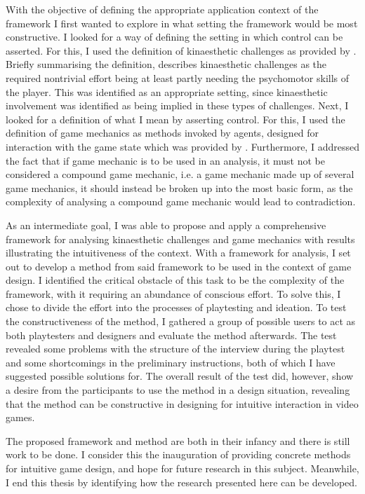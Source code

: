 With the objective of defining the appropriate application context of the framework I first wanted to explore in what setting the framework would be most constructive. I looked for a way of defining the setting in which control can be asserted. For this, I used the definition of kinaesthetic challenges as provided by . Briefly summarising the definition,  describes kinaesthetic challenges as the required nontrivial effort being at least partly needing the psychomotor skills of the player. This was identified as an appropriate setting, since kinaesthetic involvement was identified as being implied in these types of challenges. Next, I looked for a definition of what I mean by asserting control. For this, I used the definition of game mechanics as methods invoked by agents, designed for interaction with the game state which was provided by . Furthermore, I addressed the fact that if game mechanic is to be used in an analysis, it must not be considered a compound game mechanic, i.e. a game mechanic made up of several game mechanics, it should instead be broken up into the most basic form, as the complexity of analysing a compound game mechanic would lead to contradiction.

As an intermediate goal, I was able to propose and apply a comprehensive framework for analysing kinaesthetic challenges and game mechanics with results illustrating the intuitiveness of the context. With a framework for analysis, I set out to develop a method from said framework to be used in the context of game design. I identified the critical obstacle of this task to be the complexity of the framework, with it requiring an abundance of conscious effort. To solve this, I chose to divide the effort into the processes of playtesting and ideation. To test the constructiveness of the method, I gathered a group of possible users to act as both playtesters and designers and evaluate the method afterwards. The test revealed some problems with the structure of the interview during the playtest and some shortcomings in the preliminary instructions, both of which I have suggested possible solutions for. The overall result of the test did, however, show a desire from the participants to use the method in a design situation, revealing that the method can be constructive in designing for intuitive interaction in video games.

The proposed framework and method are both in their infancy and there is still work to be done. I consider this the inauguration of providing concrete methods for intuitive game design, and hope for future research in this subject. Meanwhile, I end this thesis by identifying how the research presented here can be developed.

